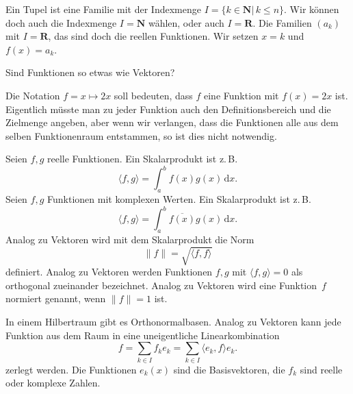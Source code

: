\documentclass[a4paper,10pt,fleqn,twocolumn,twoside]{article}
\numberwithin{equation}{section}
\begin{document}
Ein Tupel ist eine Familie mit der Indexmenge
$I=\{k\in\mathbf N|\,k\leq n\}.$ Wir können doch auch die
Indexmenge $I=\mathbf N$ wählen, oder auch $I=\mathbf R$.
Die Familien $(a_k)$ mit $I=\mathbf R$, das sind doch die
reellen Funktionen. Wir setzen $x=k$ und $f(x)=a_k$.

Sind Funktionen so etwas wie Vektoren?

Die Notation $f=x\mapsto 2x$ soll bedeuten, dass $f$ eine
Funktion mit $f(x)=2x$ ist. Eigentlich müsste man zu jeder Funktion
auch den Definitionsbereich und die Zielmenge angeben, aber wenn
wir verlangen, dass die Funktionen alle aus dem selben Funktionenraum
entstammen, so ist dies nicht notwendig.

Seien $f,g$ reelle Funktionen. Ein Skalarprodukt ist z.\,B.
\begin{equation}
\langle f,g\rangle = \int_a^b f(x)g(x)\,\mathrm dx.
\end{equation}
Seien $f,g$ Funktionen mit komplexen Werten.
Ein Skalarprodukt ist z.\,B.
\begin{equation}
\langle f,g\rangle = \int_a^b \overline{f(x)}g(x)\,\mathrm dx.
\end{equation}
Analog zu Vektoren wird mit dem Skalarprodukt die Norm
\begin{equation}
\|f\| = \sqrt{\langle f,f\rangle}
\end{equation}
definiert. Analog zu Vektoren werden Funktionen $f,g$ mit
$\langle f,g\rangle=0$ als orthogonal zueinander bezeichnet.
Analog zu Vektoren wird eine Funktion~$f$ normiert genannt,
wenn $\|f\|=1$ ist.

In einem Hilbertraum gibt es Orthonormalbasen. Analog zu Vektoren
kann jede Funktion aus dem Raum in eine uneigentliche
Linearkombination
\begin{equation}
f = \sum_{k\in I} f_ke_k = \sum_{k\in I} \langle e_k,f\rangle e_k.
\end{equation}
zerlegt werden. Die Funktionen $e_k(x)$ sind die Basisvektoren,
die $f_k$ sind reelle oder komplexe Zahlen.
\end{document}
